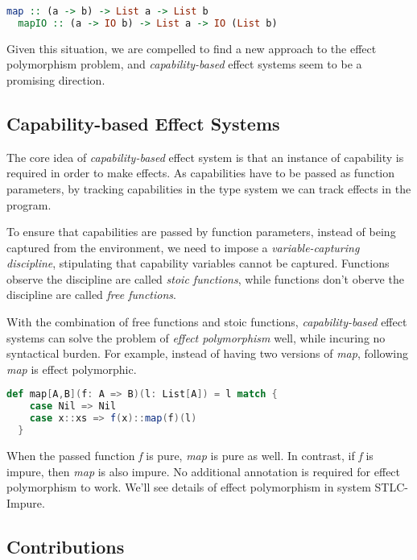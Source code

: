 \begin{lstlisting}[language=Haskell]
  map :: (a -> b) -> List a -> List b
  mapIO :: (a -> IO b) -> List a -> IO (List b)
\end{lstlisting}

Given this situation, we are compelled to find a new approach to the
effect polymorphism problem, and \emph{capability-based} effect
systems seem to be a promising direction.

\subsection{Capability-based Effect Systems}

The core idea of \emph{capability-based} effect system is that an
instance of capability is required in order to make effects. As
capabilities have to be passed as function parameters, by tracking
capabilities in the type system we can track effects in the program.

To ensure that capabilities are passed by function parameters, instead
of being captured from the environment, we need to impose a
\emph{variable-capturing discipline}, stipulating that capability
variables cannot be captured. Functions observe the discipline are
called \emph{stoic functions}, while functions don't oberve the
discipline are called \emph{free functions}.

With the combination of free functions and stoic functions,
\emph{capability-based} effect systems can solve the problem of
\emph{effect polymorphism} well, while incuring no syntactical
burden. For example, instead of having two versions of \emph{map},
following \emph{map} is effect polymorphic.

\begin{lstlisting}[language=Scala]
  def map[A,B](f: A => B)(l: List[A]) = l match {
    case Nil => Nil
    case x::xs => f(x)::map(f)(l)
  }
\end{lstlisting}

When the passed function \emph{f} is pure, \emph{map} is pure as
well. In contrast, if \emph{f} is impure, then \emph{map} is also
impure. No additional annotation is required for effect polymorphism
to work. We'll see details of effect polymorphism in system
STLC-Impure.

\subsection{Contributions}


